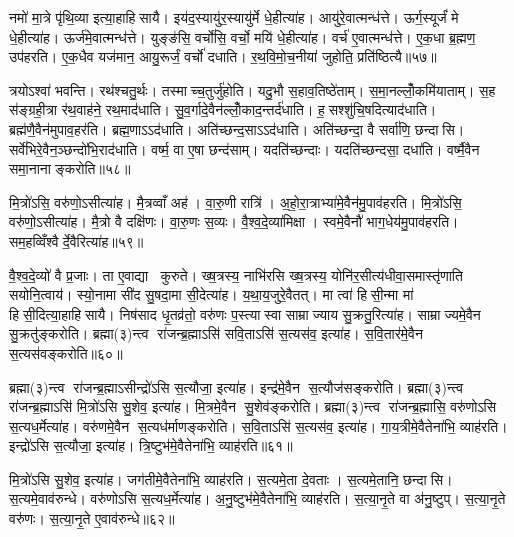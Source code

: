 नमो॑ मा॒त्रे पृ॑थि॒व्या इत्या॒हाहिसायै। इय॑द॒स्यायु॑र॒स्यायु॑र्मे धे॒हीत्या॑ह। आयु॑रे॒वात्मन्ध॑त्ते। ऊर्ग॒स्यूर्जं॑ मे धे॒हीत्या॑ह। ऊर्ज॑मे॒वात्मन्ध॑त्ते। युङ्ङ॑सि॒ वर्चो॑सि॒ वर्चो॒ मयि॑ धे॒हीत्या॑ह। वर्च॑ ए॒वात्मन्ध॑त्ते। ए॒क॒धा ब्र॒ह्मण॒ उप॑हरति। ए॒क॒धैव यज॑मान॒ आयु॒रूर्जं॒ वर्चो॑ दधाति। र॒थ॒वि॒मो॒च॒नीया॑ जुहोति॒ प्रति॑ष्ठित्यै॥५७॥

त्रयोऽश्वा॑ भवन्ति। रथ॑श्चतु॒र्थः। तस्माच्च॒तुर्जु॑होति। यदु॒भौ स॒हाव॒तिष्ठे॑ताम्। स॒मा॒नल्लोँ॒कमि॑याताम्। स॒ह स॑ङ्ग्रही॒त्रा र॑थ॒वाह॑ने॒ रथ॒माद॑धाति। सु॒व॒र्गादे॒वैन॑ल्लोँ॒काद॒न्तर्द॑धाति। ह॒सश्शु॑चि॒षदित्याद॑धाति। ब्रह्म॑णै॒वैन॑मुपाव॒हर॑ति। ब्रह्म॒णाऽऽद॑धाति। अति॑च्छन्द॒साऽऽद॑धाति। अति॑च्छन्दा॒ वै सर्वा॑णि॒ छन्दासि। सर्वे॑भिरे॒वैन॒ञ्छन्दो॑भि॒राद॑धाति। वर्ष्म॒ वा ए॒षा छन्द॑साम्। यदति॑च्छन्दाः। यदति॑च्छन्दसा॒ दधा॑ति। वर्ष्मै॒वैन समा॒नानाङ्करोति॥५८॥\anuvakamend[प॒द्य॒न्ते॒ द॒धा॒ति॒ वी॒र्ये॑णेत्या॒हानात्यै॒ प्रति॑ष्ठित्यै॒ ब्रह्म॒णाऽऽद॑धाति स॒प्त च॑]

मि॒त्रो॑ऽसि॒ वरु॑णो॒ऽसीत्या॑ह। मै॒त्रव्वाँ अह॑। वा॒रु॒णी रात्रि॑। अ॒हो॒रा॒त्राभ्या॑मे॒वैन॑मु॒पाव॑हरति। मि॒त्रो॑ऽसि॒ वरु॑णो॒ऽसीत्या॑ह। मै॒त्रो वै दक्षि॑णः। वा॒रु॒णः स॒व्यः। वै॒श्व॒दे॒व्या॑मिक्षा। स्वमे॒वैनौ॑ भाग॒धेय॑मु॒पाव॑हरति। सम॒हव्विँश्वैर्दे॒वैरित्या॑ह॥५९॥

वै॒श्व॒दे॒व्यो॑ वै प्र॒जाः। ता ए॒वाद्या कुरुते। ख्ष॒त्रस्य॒ नाभि॑रसि ख्ष॒त्रस्य॒ योनि॑र॒सीत्य॑धीवा॒समास्तृ॑णाति सयोनि॒त्वाय॑। स्यो॒नामा सी॑द सु॒षदा॒मा सी॒देत्या॑ह। य॒था॒य॒जुरे॒वैतत्। मा त्वा॑ हिसी॒न्मा मा॑ हिसी॒दित्या॒हाहिसायै। निष॑साद धृ॒तव्र॑तो॒ वरु॑णः प॒स्त्यास्वा साम्राज्याय सु॒क्रतु॒रित्या॑ह। साम्राज्यमे॒वैन सु॒क्रतु॑ङ्करोति। ब्रह्मा(३)न्त्व रा॑जन्ब्र॒ह्माऽसि॑ सवि॒ताऽसि॑ स॒त्यस॑व॒ इत्या॑ह। स॒वि॒तार॑मे॒वैन स॒त्यस॑वङ्करोति॥६०॥

ब्रह्मा(३)न्त्व रा॑जन्ब्र॒ह्माऽसीन्द्रो॑ऽसि स॒त्यौजा॒ इत्या॑ह। इन्द्र॑मे॒वैन स॒त्यौज॑सङ्करोति। ब्रह्मा(३)न्त्व रा॑जन्ब्र॒ह्माऽसि॑ मि॒त्रो॑ऽसि सु॒शेव॒ इत्या॑ह। मि॒त्रमे॒वैन सु॒शेव॑ङ्करोति। ब्रह्मा(३)न्त्व रा॑जन्ब्र॒ह्मासि॒ वरु॑णोऽसि स॒त्यध॒र्मेत्या॑ह। वरु॑णमे॒वैन स॒त्यध॑र्माणङ्करोति। स॒वि॒ताऽसि॑ स॒त्यस॑व॒ इत्या॑ह। गा॒य॒त्रीमे॒वैतेना॑भि॒ व्याह॑रति। इन्द्रो॑ऽसि स॒त्यौजा॒ इत्या॑ह। त्रि॒ष्टुभ॑मे॒वैतेना॑भि॒ व्याह॑रति॥६१॥

मि॒त्रो॑ऽसि सु॒शेव॒ इत्या॑ह। जग॑तीमे॒वैतेना॑भि॒ व्याह॑रति। स॒त्यमे॒ता दे॒वताः। स॒त्यमे॒तानि॒ छन्दासि। स॒त्यमे॒वाव॑रुन्धे। वरु॑णोऽसि स॒त्यध॒र्मेत्या॑ह। अ॒नु॒ष्टुभ॑मे॒वैतेना॑भि॒ व्याह॑रति। स॒त्या॒नृ॒ते वा अ॑नु॒ष्टुप्। स॒त्या॒नृ॒ते वरु॑णः। स॒त्या॒नृ॒ते ए॒वाव॑रुन्धे॥६२॥

